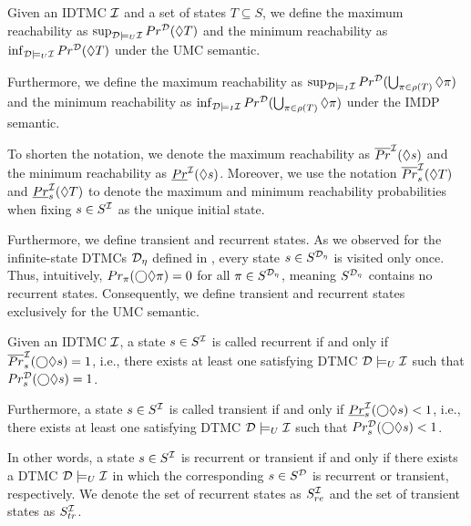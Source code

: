 \begin{definition}
    Given an IDTMC $\mathcal{I}$ and a set of states $T\subseteq S$, we define the maximum reachability as $\sup_{\mathcal{D}\models_U \mathcal{I}}Pr^{\mathcal{D}}(\lozenge T)$ and the minimum reachability as $\inf_{\mathcal{D}\models_U \mathcal{I}}Pr^{\mathcal{D}}(\lozenge T)$ under the UMC semantic.

    Furthermore, we define the maximum reachability as $\sup_{\mathcal{D}\models_I \mathcal{I}}Pr^{\mathcal{D}}(\bigcup_{\pi\in\rho(T)}\lozenge \pi)$ and the minimum reachability as $\inf_{\mathcal{D}\models_I \mathcal{I}}Pr^{\mathcal{D}}(\bigcup_{\pi\in\rho(T)}\lozenge \pi)$ under the IMDP semantic.

\end{definition}
To shorten the notation, we denote the maximum reachability as $\overline{Pr}^{\mathcal{I}}(\lozenge s)$ and the minimum reachability as $\underline{Pr}^{\mathcal{I}}(\lozenge s)$.
Moreover, we use the notation $\overline{Pr}^{\mathcal{I}}_s(\lozenge T)$ and $\underline{Pr}^{\mathcal{I}}_s(\lozenge T)$ to denote the maximum and minimum reachability probabilities when fixing $s\in S^{\mathcal{I}}$ as the unique initial state.

Furthermore, we define transient and recurrent states. As we observed for the infinite-state DTMCs $\mathcal{D}_\eta$ defined in , every state $s\in S^{\mathcal{D}_\eta}$ is visited only once. Thus, intuitively, $Pr_\pi(\bigcirc\lozenge \pi) = 0$ for all $\pi\in S^{\mathcal{D}_\eta}$, meaning $S^{\mathcal{D}_\eta}$ contains no recurrent states. Consequently, we define transient and recurrent states exclusively for the UMC semantic.
\begin{definition}\label{def:transient_recurrent_states_IDTMC}
    Given an IDTMC $\mathcal{I}$, a state $s\in S^{\mathcal{I}}$ is called recurrent if and only if $\overline{Pr}^{\mathcal{I}}_s(\bigcirc\lozenge s) = 1$, i.e., there exists at least one satisfying DTMC $\mathcal{D}\models_U\mathcal{I}$ such that $Pr^{\mathcal{D}}_s(\bigcirc\lozenge s) = 1$. 
    
    Furthermore, a state $s\in S^{\mathcal{I}}$ is called transient if and only if $\underline{Pr}^{\mathcal{I}}_s(\bigcirc\lozenge s) < 1$, i.e., there exists at least one satisfying DTMC $\mathcal{D}\models_U\mathcal{I}$ such that $Pr^{\mathcal{D}}_s(\bigcirc\lozenge s) < 1$.

\end{definition}
In other words, a state $s\in S^{\mathcal{I}}$ is recurrent or transient if and only if there exists a DTMC $\mathcal{D} \models_U \mathcal{I}$ in which the corresponding $s\in S^{\mathcal{D}}$ is recurrent or transient, respectively.
We denote the set of recurrent states as $S^{\mathcal{I}}_{re}$ and the set of transient states as $S^{\mathcal{I}}_{tr}$.

